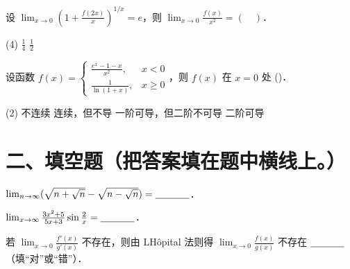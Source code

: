 \documentclass[
  a4paper,
  11pt,
  title in boldface,
  theorem in new line,
  remove problem qed
]{homework}
\begin{document}
\begin{problem}
  设 $\lim_{x \to 0} \left( 1+\frac{f(2x)}{x} \right)^{1/x} = e$，则 $\lim_{x \to 0} \frac{f(x)}{x^2} = (\quad)$．

  \begin{tasks}(4)
  \task $\frac{1}{4}$
  \task $\frac{1}{2}$
\end{tasks}
\end{problem}

\begin{problem}
  设函数 $f(x) = \begin{cases} \frac{e^x-1-x}{x^2}, & x < 0 \\ \frac{1}{\ln(1+x)}, & x \ge 0 \end{cases}$，则 $f(x)$ 在 $x=0$ 处 (\quad)．

  \begin{tasks}(2)
  \task 不连续
  \task 连续，但不导
  \task 一阶可导，但二阶不可导
  \task 二阶可导
\end{tasks}
\end{problem}

\section*{二、填空题（把答案填在题中横线上。）}

\begin{problem}
  $\lim_{n \to \infty} (\sqrt{n+\sqrt{n}} - \sqrt{n-\sqrt{n}}) = \underline{\hspace{3.5em}}$．

  \vspace{0.8cm}
\end{problem}

\begin{problem}
  $\lim_{x \to \infty} \frac{3x^2+5}{5x+3} \sin \frac{2}{x} = \underline{\hspace{3.5em}}$．

  \vspace{0.8cm}
\end{problem}

\begin{problem}
  若 $\lim_{x \to 0} \frac{f'(x)}{g'(x)}$ 不存在，则由 LHôpital 法则得 $\lim_{x \to 0} \frac{f(x)}{g(x)}$ 不存在 $\underline{\hspace{3.5em}}$ （填“对”或“错”）．

  \vspace{0.8cm}
\end{problem}
\end{document}
